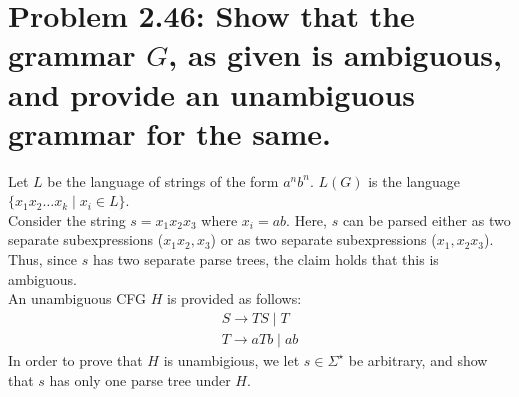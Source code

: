 \documentclass[12pt]{article}
\begin{document}
\section*{Problem 2.46: Show that the grammar $G$, as given is ambiguous, and provide an unambiguous grammar for the same.}
Let $L$ be the language of strings of the form $a^{n}b^{n}$. $L(G)$ is the language $\{x_{1}x_{2} \ldots x_{k} \mid x_{i} \in L\}$. \\
\newline
Consider the string $s = x_{1}x_{2}x_{3}$ where $x_{i} = ab$. Here, $s$ can be parsed either as two separate subexpressions ($x_{1}x_{2}, x_{3}$) or as two separate subexpressions ($x_{1}, x_{2}x_{3}$). Thus, since $s$ has two separate parse trees, the claim holds that this is ambiguous. \\
\newline
An unambiguous CFG $H$ is provided as follows:
\begin{align*}
  S \rightarrow TS \mid T \nonumber \\
  T \rightarrow aTb \mid ab \nonumber
\end{align*}
In order to prove that $H$ is unambigious, we let $s \in \Sigma^{\star}$ be arbitrary, and show that $s$ has only one parse tree under $H$.
\end{document}
